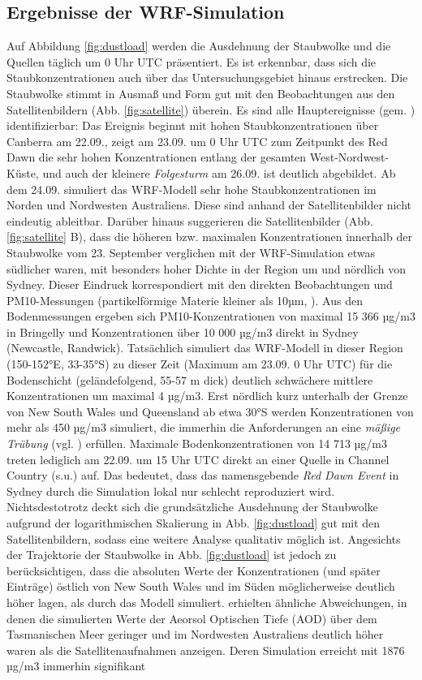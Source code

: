\documentclass[12pt,a4paper,onecolumn,headheight=30pt]{scrartcl}
\begin{document}
\subsection{Ergebnisse der WRF-Simulation} \label{sec:wrf_results}
Auf Abbildung \ref{fig:dustload} werden die Ausdehnung der Staubwolke und die Quellen täglich um 0 Uhr UTC präsentiert. Es ist erkennbar, dass sich die Staubkonzentrationen auch über das Untersuchungsgebiet hinaus erstrecken. Die Staubwolke stimmt in Ausmaß und Form gut mit den Beobachtungen aus den Satellitenbildern (Abb. \ref{fig:satellite}) überein. Es sind alle Hauptereignisse (gem. \cite{Leys.2009}) identifizierbar: Das Ereignis beginnt mit hohen Staubkonzentrationen über Canberra am 22.09., zeigt am 23.09. um 0 Uhr UTC zum Zeitpunkt des Red Dawn die sehr hohen Konzentrationen entlang der gesamten West-Nordwest-Küste, und auch der kleinere \textit{Folgesturm} am 26.09. ist deutlich abgebildet. Ab dem 24.09. simuliert das WRF-Modell sehr hohe Staubkonzentrationen im Norden und Nordwesten Australiens. Diese sind anhand der Satellitenbilder nicht eindeutig ableitbar. Darüber hinaus suggerieren die Satellitenbilder (Abb. \ref{fig:satellite} B), dass die höheren bzw. maximalen Konzentrationen innerhalb der Staubwolke vom 23. September verglichen mit der WRF-Simulation etwas südlicher waren, mit besonders hoher Dichte in der Region um und nördlich von Sydney. Dieser Eindruck korrespondiert mit den direkten Beobachtungen und PM10-Messungen (partikelförmige Materie kleiner als 10µm, \cite{Leys.2011}). Aus den Bodenmessungen ergeben sich PM10-Konzentrationen von maximal 15 366 µg/m3 in Bringelly und Konzentrationen über 10 000 µg/m3 direkt in Sydney (Newcastle, Randwick). Tatsächlich simuliert das WRF-Modell in dieser Region (150-152°E, 33-35°S) zu dieser Zeit (Maximum am 23.09. 0 Uhr UTC) für die Bodenschicht (geländefolgend, 55-57 m dick) deutlich schwächere mittlere Konzentrationen um maximal 4 µg/m3. Erst nördlich kurz unterhalb der Grenze von New South Wales und Queensland ab etwa 30°S werden Konzentrationen von mehr als 450 µg/m3 simuliert, die immerhin die Anforderungen an eine \textit{mäßige Trübung} (vgl. \cite{Leys.2011}) erfüllen. Maximale Bodenkonzentrationen von 14 713 µg/m3 treten lediglich am 22.09. um 15 Uhr UTC direkt an einer Quelle in Channel Country (s.u.) auf. Das bedeutet, dass das namensgebende \textit{Red Dawn Event} in Sydney durch die Simulation lokal nur schlecht reproduziert wird. Nichtsdestotrotz deckt sich die grundsätzliche Ausdehnung der Staubwolke aufgrund der logarithmischen Skalierung in Abb. \ref{fig:dustload} gut mit den Satellitenbildern, sodass eine weitere Analyse qualitativ möglich ist. Angesichts der Trajektorie der Staubwolke in Abb. \ref{fig:dustload} ist jedoch zu berücksichtigen, dass die absoluten Werte der Konzentrationen (und später Einträge) östlich von New South Wales und im Süden möglicherweise deutlich höher lagen, als durch das Modell simuliert. \citet{AlizadehChoobari.2012} erhielten ähnliche Abweichungen, in denen die simulierten Werte der Aeorsol Optischen Tiefe (AOD) über dem Tasmanischen Meer geringer und im Nordwesten Australiens deutlich höher waren als die Satellitenaufnahmen anzeigen. Deren Simulation erreicht mit 1876 µg/m3 immerhin signifikant 
\end{document}
